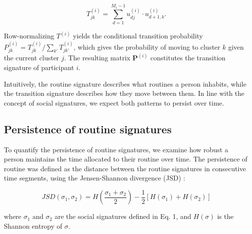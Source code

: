 \documentclass[pdflatex,sn-vancouver,Numbered]{bst/sn-jnl}%
\theoremstyle{thmstyleone}%
\theoremstyle{thmstyletwo}%
\theoremstyle{thmstylethree}%
\begin{document}
\begin{equation}
    T_{jk}^{(i)} = \sum_{d=1}^{M_i - 1} u_{dj}^{(i)} \cdot u_{d+1,k}^{(i)}.
\end{equation}

Row-normalizing $T^{(i)}$ yields the conditional transition probability $P_{jk}^{(i)} = T_{jk}^{(i)} / \sum_{k'} T_{jk'}^{(i)}$, which gives the probability of moving to cluster $k$ given the current cluster $j$. The resulting matrix $\mathbf{P}^{(i)}$ constitutes the transition signature of participant $i$.

Intuitively, the routine signature describes what routines a person inhabits, while the transition signature describes how they move between them. In line with the concept of social signatures, we expect both patterns to persist over time.

\subsection*{Persistence of routine signatures}\label{sec:methods:signature_persistence}  

To quantify the persistence of routine signatures, we examine how robust a person maintains the time allocated to their routine over time. The persistence of routine was defined as the distance between the routine signatures in consecutive time segments, using the Jensen-Shannon divergence (JSD) \cite{lin1991divergence}:

\begin{equation}
JSD(\sigma_1, \sigma_2) = H(\frac{\sigma_1 + \sigma_2}{2}) - \frac{1}{2}[H(\sigma_1) + H(\sigma_2)]
\end{equation}

where $\sigma_1$ and $\sigma_2$ are the social signatures defined in Eq. 1, and $H(\sigma)$ is the Shannon entropy of $\sigma$.
\end{document}
